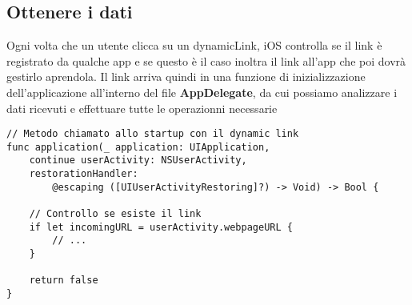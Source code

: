 \subsection*{Ottenere i dati}

Ogni volta che un utente clicca su un dynamicLink, iOS controlla
se il link è registrato da qualche app e se questo è il caso
inoltra il link all'app che poi dovrà gestirlo aprendola. 
Il link arriva quindi in una funzione di inizializzazione dell'applicazione all'interno del
file \textbf{AppDelegate}, da cui possiamo analizzare i dati ricevuti e effettuare tutte le operazionni necessarie

\begin{verbatim}
// Metodo chiamato allo startup con il dynamic link
func application(_ application: UIApplication,
    continue userActivity: NSUserActivity,
    restorationHandler: 
        @escaping ([UIUserActivityRestoring]?) -> Void) -> Bool {
        
    // Controllo se esiste il link
    if let incomingURL = userActivity.webpageURL {
        // ...
    }
    
    return false
}
\end{verbatim}